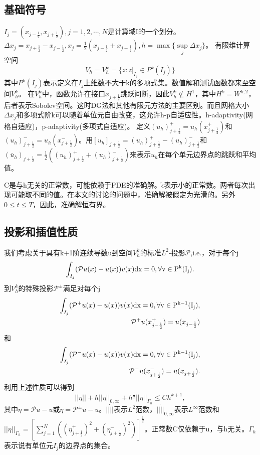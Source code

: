 \subsection{基础符号}
$I_j = (x_{j-\frac{1}{2}},x_{j+\frac{1}{2}}),j=1,2,\cdots,N$是计算域I的一个划分。$\Delta x_j = x_{j+\frac{1}{2}}-x_{j-\frac{1}{2}},x_j = \frac{1}{2}(x_{j-\frac{1}{2}}+x_{j+\frac{1}{2}}), h = \max\{\sup\limits_{j} \Delta x_j\}$。
有限维计算空间
\begin{equation*}
    V_h = V_h^k = \{z:z|_{I_j} \in P^k(I_j)\}
\end{equation*}
其中$P^k(I_j)$表示定义在$I_j$上维数不大于k的多项式集。数值解和测试函数都来至空间$V_h^k$。
在$V_h^k$中，函数允许在接口$x_{j+\frac{1}{2}}$跳跃间断，因此$V_h^k \not\subseteq H^1$，其中$H^k = W^{k,2}$，后者表示Sobolev空间。这时DG法和其他有限元方法的主要区别。而且网格大小$\Delta x_j$和多项式阶k可以随着单位元自由改变，这允许h-p自适应性。h-adaptivity(网格自适应)，p-adaptivity(多项式自适应)。
定义$(u_h)^+_{j+\frac{1}{2}} = u_h(x^+_{j+\frac{1}{2}})$和$(u_h)^-_{j+\frac{1}{2}} = u_h(x^-_{j+\frac{1}{2}})$。用$[u_h]_{j+\frac{1}{2}} = (u_h)^+_{j+\frac{1}{2}} - (u_h)^-_{j+\frac{1}{2}}$和$(\bar{u}_h)_{j+\frac{1}{2}}=\frac{1}{2}((u_h)^+_{j+\frac{1}{2}}+(u_h)^-_{j+\frac{1}{2}})$来表示$u_h$在每个单元边界点的跳跃和平均值。

C是与h无关的正常数，可能依赖于PDE的准确解。$\tilde{\epsilon}$表示小的正常数。两者每次出现可能取不同的值。在本文的讨论的问题中，准确解被假定为光滑的。另外$0\leq t \leq T$，因此，准确解恒有界。
\subsection{投影和插值性质}
我们考虑关于具有k+1阶连续导数u到空间$V_h^k$的标准$L^2$-投影$\mathcal{P}$,i.e.，对于每个j
\begin{equation}
    \int_{I_j}(\mathcal{P}u(x) - u(x))v(x)\rm{d} x = 0, \forall v \in P^k(I_j).
\end{equation}
到$V_h^k$的特殊投影$\mathcal{P}^{\pm}$满足对每个j
\begin{align}
    \int_{I_j}(\mathcal{P}^+u(x) - u(x))v(x)\rm{d} x = 0, \forall v \in P^{k-1}(I_j), \\
    \mathcal{P}^+u(x_{j-\frac{1}{2}}^+) = u(x_{j-\frac{1}{2}})\nonumber
\end{align}
和
\begin{align}
    \int_{I_j}(\mathcal{P}^-u(x) - u(x))v(x)\rm{d} x = 0, \forall v \in P^{k-1}(I_j), \\
    \mathcal{P}^-u(x_{j+\frac{1}{2}}^-) = u(x_{j+\frac{1}{2}}).\nonumber
\end{align}
利用上述性质可以得到
\begin{equation}
    ||\eta|| + h||\eta||_{0,\infty} + h^{\frac{1}{2}}||\eta||_{\Gamma_h} \leq Ch^{k+1},
\end{equation}
其中$\eta = \mathcal{P}u - u$或$\eta = \mathcal{P}^{\pm}u - u$。$||\dot||$表示$L^2$范数，$||\dot||_{0,\infty}$表示$L^{\infty}$范数和$||\eta||_{\Gamma_h} = [\sum_{j=1}^{N}((\eta_{j+\frac{1}{2}}^+)^2 + (\eta_{j+\frac{1}{2}}^-)^2)]^{\frac{1}{2}}$。正常数C仅依赖于u，与h无关。$\Gamma_h$表示说有单位元$I_j$的边界点的集合。
